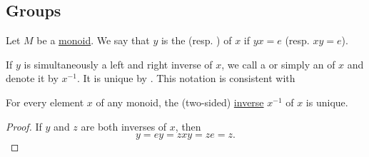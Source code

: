 \subsection{Groups}\label{subsec:groups}

\begin{definition}\label{def:monoid_inverse_element}
  Let \( M \) be a \hyperref[def:monoid]{monoid}. We say that \( y \) is the  (resp. ) of \( x \) if \( yx = e \) (resp. \( xy = e \)).

  If \( y \) is simultaneously a left and right inverse of \( x \), we call a  or simply an  of \( x \) and denote it by \( x^{-1} \). It is unique by . This notation is consistent with 
\end{definition}

\begin{proposition}\label{def:monoid_inverse_element_unique}
  For every element \( x \) of any monoid, the (two-sided) \hyperref[def:monoid_inverse_element]{inverse} \( x^{-1} \) of \( x \) is unique.
\end{proposition}
\begin{proof}
  If \( y \) and \( z \) are both inverses of \( x \), then
  \begin{equation*}
    y = ey = zxy = ze = z.
  \end{equation*}
\end{proof}

